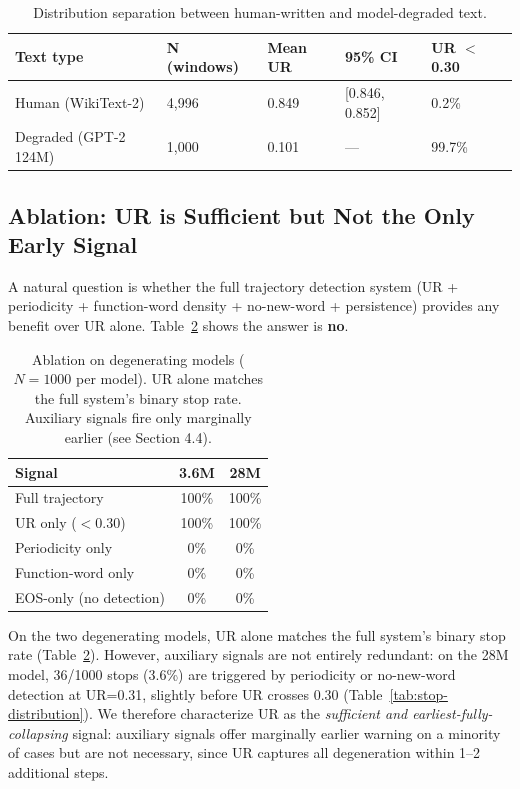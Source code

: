 \documentclass[11pt]{article}
\begin{document}
\begin{table}[t]
\centering
\caption{Distribution separation between human-written and model-degraded text.}
\label{tab:separation}
\begin{tabular}{lllll}
\toprule
\textbf{Text type} & \textbf{N (windows)} & \textbf{Mean UR} & \textbf{95\% CI} & \textbf{UR $<$ 0.30} \\
\midrule
Human (WikiText-2) & 4,996 & 0.849 & [0.846, 0.852] & 0.2\% \\
Degraded (GPT-2 124M) & 1,000 & 0.101 & --- & 99.7\% \\
\bottomrule
\end{tabular}
\end{table}

\subsection{Ablation: UR is Sufficient but Not the Only Early Signal}

A natural question is whether the full trajectory detection system (UR + periodicity + function-word density + no-new-word + persistence) provides any benefit over UR alone. Table~\ref{tab:ablation} shows the answer is \textbf{no}.

\begin{table}[t]
\centering
\caption{Ablation on degenerating models ($N=1000$ per model). UR alone
matches the full system's binary stop rate. Auxiliary signals fire only
marginally earlier (see Section 4.4).}
\label{tab:ablation}
\begin{tabular}{lcc}
\toprule
Signal & 3.6M & 28M \\
\midrule
Full trajectory & 100\% & 100\% \\
UR only ($<0.30$) & 100\% & 100\% \\
Periodicity only & 0\% & 0\% \\
Function-word only & 0\% & 0\% \\
EOS-only (no detection) & 0\% & 0\% \\
\bottomrule
\end{tabular}
\end{table}

On the two degenerating models, UR alone matches the full system's binary stop rate (Table~\ref{tab:ablation}). However, auxiliary signals are not entirely redundant: on the 28M model, 36/1000 stops (3.6\%) are triggered by periodicity or no-new-word detection at UR=0.31, slightly before UR crosses 0.30 (Table~\ref{tab:stop-distribution}). We therefore characterize UR as the \emph{sufficient and earliest-fully-collapsing} signal: auxiliary signals offer marginally earlier warning on a minority of cases but are not necessary, since UR captures all degeneration within 1--2 additional steps.
\end{document}
